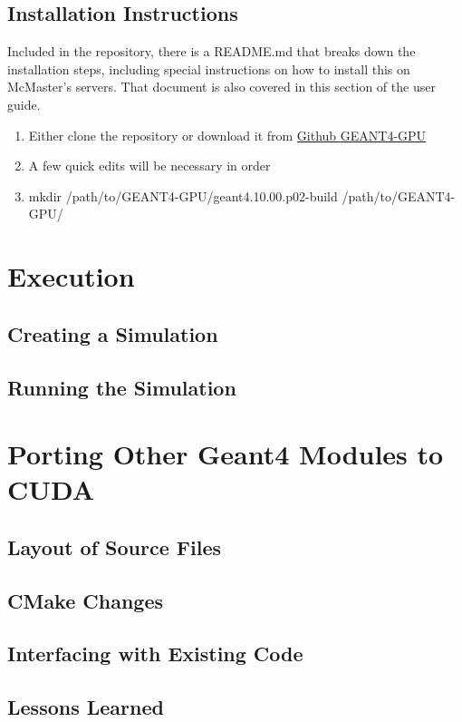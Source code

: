 \documentclass[12pt]{article}
\begin{document}
\subsection{Installation Instructions} %
Included in the repository, there is a README.md that breaks down the installation steps, including special instructions on how to install this on McMaster's servers. That document is also covered in this section of the user guide. \\
\begin{enumerate}
\item Either clone the repository or download it from \href{https://github.com/studouglas/GEANT4-GPU}{Github GEANT4-GPU}
\item A few quick edits will be necessary in order
\item mkdir /path/to/GEANT4-GPU/geant4.10.00.p02-build /path/to/GEANT4-GPU/
\end{enumerate}
\section{Execution} %
\subsection{Creating a Simulation} %
\subsection{Running the Simulation} %

\section{Porting Other Geant4 Modules to CUDA} %
\subsection{Layout of Source Files} %
\subsection{CMake Changes} %
\subsection{Interfacing with Existing Code} %
\subsection{Lessons Learned} %
\end{document}
